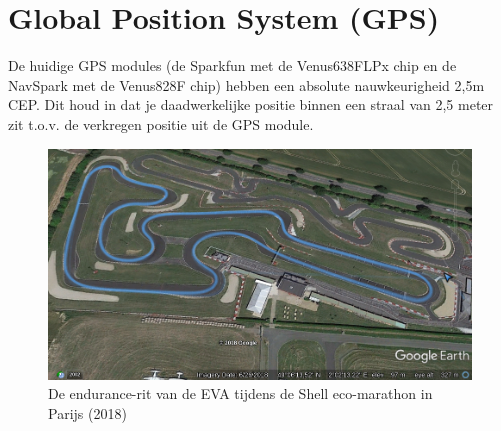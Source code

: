 \documentclass[a4paper, 11pt]{article} %
\begin{document}
\section{Global Position System (GPS)}
De huidige GPS modules (de Sparkfun met de Venus638FLPx chip en de NavSpark met de Venus828F chip) hebben een absolute nauwkeurigheid 2,5m CEP. Dit houd in dat je daadwerkelijke positie binnen een straal van 2,5 meter zit t.o.v. de verkregen positie uit de GPS module.

\begin{figure}[h!]
	\centering
	\includegraphics[width=15cm]{afbeeldingen/Parijstest.png}
	\caption{De endurance-rit van de EVA tijdens de Shell eco-marathon in Parijs (2018)}
\end{figure}
\end{document}

